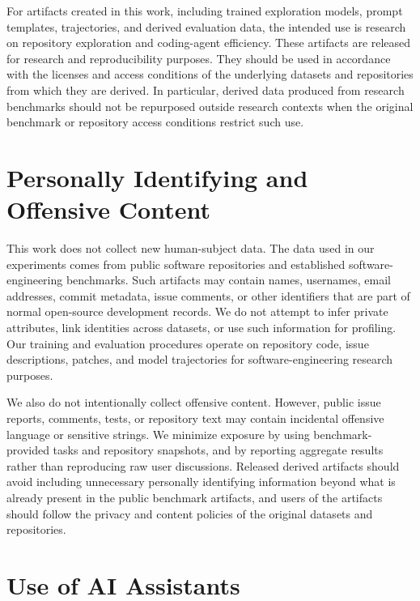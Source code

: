 For artifacts created in this work, including trained exploration models, prompt templates, trajectories, and derived evaluation data, the intended use is research on repository exploration and coding-agent efficiency. These artifacts are released for research and reproducibility purposes. They should be used in accordance with the licenses and access conditions of the underlying datasets and repositories from which they are derived. In particular, derived data produced from research benchmarks should not be repurposed outside research contexts when the original benchmark or repository access conditions restrict such use.

\section{Personally Identifying and Offensive Content}

This work does not collect new human-subject data. The data used in our experiments comes from public software repositories and established software-engineering benchmarks. Such artifacts may contain names, usernames, email addresses, commit metadata, issue comments, or other identifiers that are part of normal open-source development records. We do not attempt to infer private attributes, link identities across datasets, or use such information for profiling. Our training and evaluation procedures operate on repository code, issue descriptions, patches, and model trajectories for software-engineering research purposes.

We also do not intentionally collect offensive content. However, public issue reports, comments, tests, or repository text may contain incidental offensive language or sensitive strings. We minimize exposure by using benchmark-provided tasks and repository snapshots, and by reporting aggregate results rather than reproducing raw user discussions. Released derived artifacts should avoid including unnecessary personally identifying information beyond what is already present in the public benchmark artifacts, and users of the artifacts should follow the privacy and content policies of the original datasets and repositories.

\section{Use of AI Assistants}


